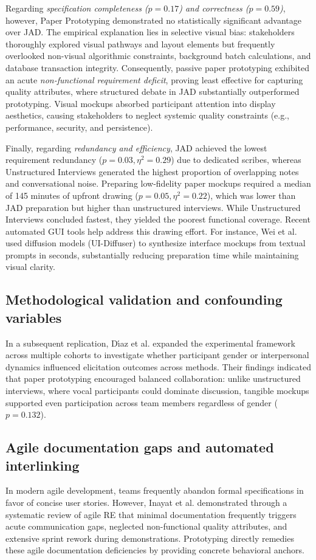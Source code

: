 Regarding \textit{specification completeness ($p = 0.17$) and correctness ($p = 0.59$)}, however, Paper Prototyping demonstrated no statistically significant advantage over JAD. The empirical explanation lies in selective visual bias: stakeholders thoroughly explored visual pathways and layout elements but frequently overlooked non-visual algorithmic constraints, background batch calculations, and database transaction integrity. Consequently, passive paper prototyping exhibited an acute \textit{non-functional requirement deficit}, proving least effective for capturing quality attributes, where structured debate in JAD substantially outperformed prototyping. Visual mockups absorbed participant attention into display aesthetics, causing stakeholders to neglect systemic quality constraints (e.g., performance, security, and persistence).

Finally, regarding \textit{redundancy and efficiency}, JAD achieved the lowest requirement redundancy ($p = 0.03, \eta^2 = 0.29$) due to dedicated scribes, whereas Unstructured Interviews generated the highest proportion of overlapping notes and conversational noise. Preparing low-fidelity paper mockups required a median of 145 minutes of upfront drawing ($p = 0.05, \eta^2 = 0.22$), which was lower than JAD preparation but higher than unstructured interviews. While Unstructured Interviews concluded fastest, they yielded the poorest functional coverage. Recent automated GUI tools help address this drawing effort. For instance, Wei et al. \cite{wei2023boosting} used diffusion models (UI-Diffuser) to synthesize interface mockups from textual prompts in seconds, substantially reducing preparation time while maintaining visual clarity.

\subsection{Methodological validation and confounding variables}
In a subsequent replication, D{\'\i}az et al. \cite{diaz2021gender} expanded the experimental framework across multiple cohorts to investigate whether participant gender or interpersonal dynamics influenced elicitation outcomes across methods. Their findings indicated that paper prototyping encouraged balanced collaboration: unlike unstructured interviews, where vocal participants could dominate discussion, tangible mockups supported even participation across team members regardless of gender ($p = 0.132$).

\subsection{Agile documentation gaps and automated interlinking}
In modern agile development, teams frequently abandon formal specifications in favor of concise user stories. However, Inayat et al. \cite{inayat2015systematic} demonstrated through a systematic review of agile RE that minimal documentation frequently triggers acute communication gaps, neglected non-functional quality attributes, and extensive sprint rework during demonstrations. Prototyping directly remedies these agile documentation deficiencies by providing concrete behavioral anchors.

